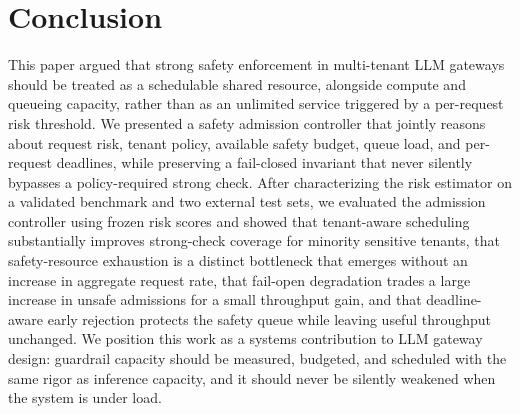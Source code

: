 \documentclass[conference]{IEEEtran}
\begin{document}
\section{Conclusion}

This paper argued that strong safety enforcement in multi-tenant LLM gateways should be treated as a schedulable shared resource, alongside compute and queueing capacity, rather than as an unlimited service triggered by a per-request risk threshold. We presented a safety admission controller that jointly reasons about request risk, tenant policy, available safety budget, queue load, and per-request deadlines, while preserving a fail-closed invariant that never silently bypasses a policy-required strong check. After characterizing the risk estimator on a validated benchmark and two external test sets, we evaluated the admission controller using frozen risk scores and showed that tenant-aware scheduling substantially improves strong-check coverage for minority sensitive tenants, that safety-resource exhaustion is a distinct bottleneck that emerges without an increase in aggregate request rate, that fail-open degradation trades a large increase in unsafe admissions for a small throughput gain, and that deadline-aware early rejection protects the safety queue while leaving useful throughput unchanged. We position this work as a systems contribution to LLM gateway design: guardrail capacity should be measured, budgeted, and scheduled with the same rigor as inference capacity, and it should never be silently weakened when the system is under load.
\end{document}
